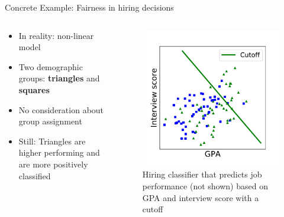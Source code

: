 \begin{frame}{Concrete Example: Fairness in hiring decisions \cite{barocas-hardt-narayanan}}
\begin{columns}
\begin{column}{0.5\textwidth}
   \begin{itemize}
       \item In reality: non-linear model
       \item Two demographic groups: \textbf{triangles} and \textbf{squares}
       \item No consideration about group assignment
       \item Still: Triangles are higher performing and are more positively classified
   \end{itemize}
\end{column}
\begin{column}{0.5\textwidth}  %
    \begin{figure}
        \centering
        \includegraphics[width=.70\textwidth]{presentation/assets/toy_example.pdf}
        \caption{Hiring classifier that predicts job performance (not shown) based on GPA and interview score with a cutoff \cite{barocas-hardt-narayanan}}
        \label{fig:example1}
    \end{figure}
\end{column}
\end{columns}
\end{frame}

